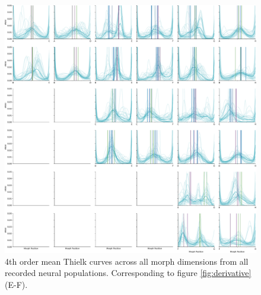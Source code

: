 \begin{figure}[tbp] 
  \centering
  \includegraphics[width=\textwidth]{figures/supplemental/sfig05-thielk-4-all-morphs.pdf}
  \caption[4th order Thielk curves for all recorded populations on all 24 morph dimensions]
{4th order mean Thielk curves across all morph dimensions from all recorded neural populations. Corresponding to figure \ref{fig:derivative} (E-F).
}
  \label{fig:thielk-all}
\end{figure}